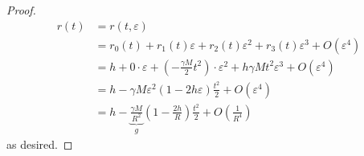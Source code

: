 \documentclass[../notes.tex]{subfiles}
\begin{document}
\begin{enumerate}[label={\textbf{1.\arabic*.}},ref={1.\arabic*},leftmargin=3.5em]
\begin{proof}
        \begin{align*}
            r(t) &= r(t,\varepsilon)\\
            &= r_0(t)+r_1(t)\varepsilon+r_2(t)\varepsilon^2+r_3(t)\varepsilon^3+O(\varepsilon^4)\\
            &= h+0\cdot\varepsilon+\left( -\frac{\gamma M}{2}t^2 \right)\cdot\varepsilon^2+h\gamma Mt^2\varepsilon^3+O(\varepsilon^4)\\
            &= h-\gamma M\varepsilon^2(1-2h\varepsilon)\frac{t^2}{2}+O(\varepsilon^4)\\
            &= h-\underbrace{\frac{\gamma M}{R^2}}_g\left( 1-\frac{2h}{R} \right)\frac{t^2}{2}+O\left( \frac{1}{R^4} \right)
        \end{align*}
        as desired.
    \end{proof}
\end{enumerate}
\end{document}
